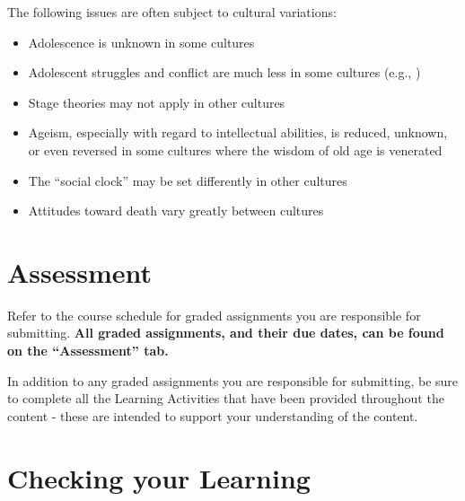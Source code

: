 \documentclass[
]{book}
\providecommand{\tightlist}{%
  \setlength{\itemsep}{0pt}\setlength{\parskip}{0pt}}
\begin{document}
The following issues are often subject to cul­tural variations:

\begin{itemize}
\tightlist
\item
  Adolescence is unknown in some cultures\\
\item
  Adolescent struggles and conflict are much less in some cultures (e.g., )\\
\item
  Stage theories may not apply in other cultures\\
\item
  Ageism, especially with regard to intellectual abilities, is reduced, unknown, or even reversed in some cultures where the wisdom of old age is venerated\\
\item
  The ``social clock'' may be set differently in other cultures\\
\item
  Attitudes toward death vary greatly between cultures
\end{itemize}

\hypertarget{assessment-3}{%
\section{Assessment}\label{assessment-3}}

\begin{assessment}
Refer to the course schedule for graded assignments you are responsible for submitting. \textbf{All graded assignments, and their due dates, can be found on the ``Assessment'' tab.}

In addition to any graded assignments you are responsible for submitting, be sure to complete all the Learning Activities that have been provided throughout the content - these are intended to support your understanding of the content.
\end{assessment}

\hypertarget{checking-your-learning-3}{%
\section*{Checking your Learning}\label{checking-your-learning-3}}
\end{document}

